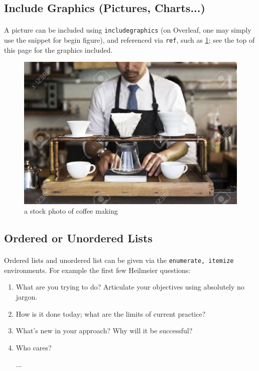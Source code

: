 \subsection*{Include Graphics (Pictures, Charts...)}
\paragraph{}A picture can be included using \texttt{includegraphics} (on Overleaf, one may simply use the snippet for begin figure), and referenced via \texttt{ref}, such as \ref{fig:example}; see the top of this page for the graphics included.
\begin{center}
\begin{figure}
    \centering
    \includegraphics[scale=1]{media/coffee.jpg}
    \caption{a stock photo of coffee making}
    \label{fig:example}
\end{figure}
\end{center}
\subsection*{Ordered or Unordered Lists}
\paragraph{}Ordered lists and unordered list can be given via the \texttt{enumerate, itemize} environments. For example the first few Heilmeier questions:
\begin{enumerate}[label=(\arabic*)]
    \item What are you trying to do? Articulate your objectives using absolutely no jargon.
    \item How is it done today; what are the limits of current practice?
    \item What's new in your approach? Why will it be successful?
    \item Who cares?
    \item[...]
\end{enumerate}
